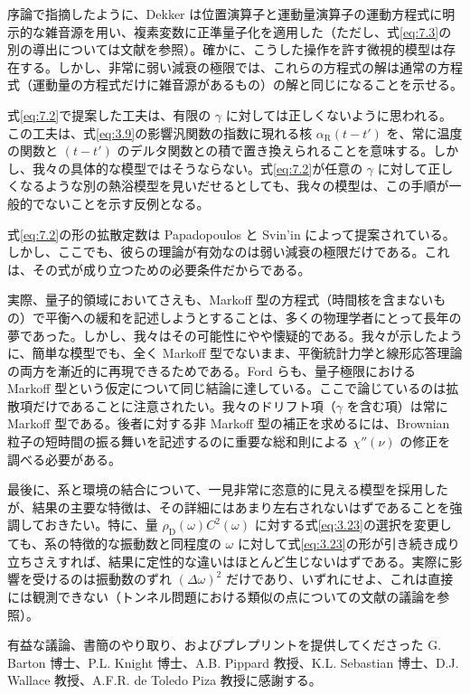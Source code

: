 序論で指摘したように、Dekker は位置演算子と運動量演算子の運動方程式に明示的な雑音源を用い、複素変数に正準量子化を適用した（ただし、式\eqref{eq:7.3}の別の導出については文献\cite{ref36}を参照）。確かに、こうした操作を許す微視的模型は存在する。しかし、非常に弱い減衰の極限では、これらの方程式の解は通常の方程式（運動量の方程式だけに雑音源があるもの）の解と同じになることを示せる\cite{ref37}。

式\eqref{eq:7.2}で提案した工夫は、有限の $\gamma$ に対しては正しくないように思われる。この工夫は、式\eqref{eq:3.9}の影響汎関数の指数に現れる核 $\alpha_{\mathrm R}(t-t')$ を、常に温度の関数と $(t-t')$ のデルタ関数との積で置き換えられることを意味する。しかし、我々の具体的な模型ではそうならない。式\eqref{eq:7.2}が任意の $\gamma$ に対して正しくなるような別の熱浴模型を見いだせるとしても、我々の模型は、この手順が一般的でないことを示す反例となる。

式\eqref{eq:7.2}の形の拡散定数は Papadopoulos\cite{ref28} と Svin'in\cite{ref38} によって提案されている。しかし、ここでも、彼らの理論が有効なのは弱い減衰の極限だけである。これは、その式が成り立つための必要条件だからである。

実際、量子的領域においてさえも、Markoff 型の方程式（時間核を含まないもの）で平衡への緩和を記述しようとすることは、多くの物理学者にとって長年の夢であった。しかし、我々はその可能性にやや懐疑的である。我々が示したように、簡単な模型でも、全く Markoff 型でないまま、平衡統計力学と線形応答理論の両方を漸近的に再現できるためである。Ford ら\cite{ref16}も、量子極限における Markoff 型という仮定について同じ結論に達している。ここで論じているのは拡散項だけであることに注意されたい。我々のドリフト項（$\gamma$ を含む項）は常に Markoff 型である。後者に対する非 Markoff 型の補正を求めるには、Brownian 粒子の短時間の振る舞いを記述するのに重要な総和則による $\chi''(\nu)$ の修正を調べる必要がある。

最後に、系と環境の結合について、一見非常に恣意的に見える模型を採用したが、結果の主要な特徴は、その詳細にはあまり左右されないはずであることを強調しておきたい。特に、量 $\rho_{\mathrm D}(\omega)C^2(\omega)$ に対する式\eqref{eq:3.23}の選択を変更しても、系の特徴的な振動数と同程度の $\omega$ に対して式\eqref{eq:3.23}の形が引き続き成り立ちさえすれば、結果に定性的な違いはほとんど生じないはずである。実際に影響を受けるのは振動数のずれ $(\Delta\omega)^2$ だけであり、いずれにせよ、これは直接には観測できない（トンネル問題における類似の点についての文献\cite{ref21}の議論を参照）。

有益な議論、書簡のやり取り、およびプレプリントを提供してくださった G. Barton 博士、P.L. Knight 博士、A.B. Pippard 教授、K.L. Sebastian 博士、D.J. Wallace 教授、A.F.R. de Toledo Piza 教授に感謝する。

